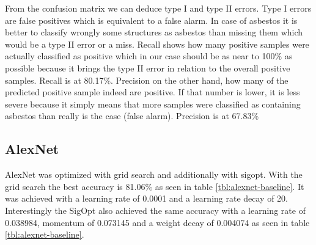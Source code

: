 From the confusion matrix we can deduce type I and type II errors. Type I errors are false positives which is equivalent to a false alarm. In case of asbestos it is better to classify wrongly some structures as asbestos than missing them which would be a type II error or a miss. Recall shows how many positive samples were actually classified as positive which in our case should be as near to 100\% as possible because it brings the type II error in relation to the overall positive samples. Recall is at 80.17\%. Precision on the other hand, how many of the predicted positive sample indeed are positive. If that number is lower, it is less severe because it simply means that more samples were classified as containing asbestos than really is the case (false alarm). Precision is at 67.83\%














\subsection{AlexNet}

AlexNet was optimized with grid search and additionally with sigopt. With the grid search the best accuracy is 81.06\% as seen in table \ref{tbl:alexnet-baseline}. It was achieved with a learning rate of 0.0001 and a learning rate decay of 20. Interestingly the SigOpt also achieved the same accuracy with a learning rate of 0.038984, momentum of 0.073145 and a weight decay of 0.004074 as seen in table \ref{tbl:alexnet-baseline}.


